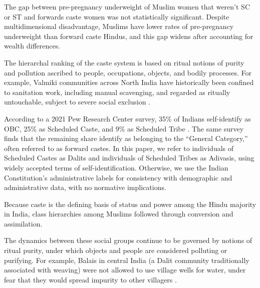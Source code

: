 The gap between pre-pregnancy underweight of Muslim women that weren't SC or ST and forwards caste women was not statistically significant. Despite multidimensional disadvantage, Muslims have lower rates of pre-pregnancy underweight than forward caste Hindus, and this gap widens after accounting for wealth differences.


The hierarchal ranking of the caste system is based on ritual notions of purity and pollution ascribed to people, occupations, objects, and bodily processes. For example, Valmiki communities across North India have historically been confined to sanitation work, including manual scavenging, and regarded as ritually untouchable, subject to severe social exclusion \citep{valmiki2008joothan}. 



According to a 2021 Pew Research Center survey, 35\% of Indians self-identify as OBC, 25\% as Scheduled Caste, and 9\% as Scheduled Tribe \citep{starr2021measuring}. The same survey finds that the remaining share identify as belonging to the “General Category,” often referred to as forward castes. In this paper, we refer to individuals of Scheduled Castes as Dalits and individuals of Scheduled Tribes as Adivasis, using widely accepted terms of self-identification. Otherwise, we use the Indian Constitution’s administrative labels for consistency with demographic and administrative data, with no normative implications.


Because caste is the defining basis of status and power among the Hindu majority in India, class hierarchies among Muslims followed through conversion and assimilation. 


The dynamics between these social groups continue to be governed by notions of ritual purity, under which objects and people are considered polluting or purifying. For example, Balais in central India (a Dalit community traditionally associated with weaving) were not allowed to use village wells for water, under fear that they would spread impurity to other villagers \citep{ambedkar2014annihilation}.

